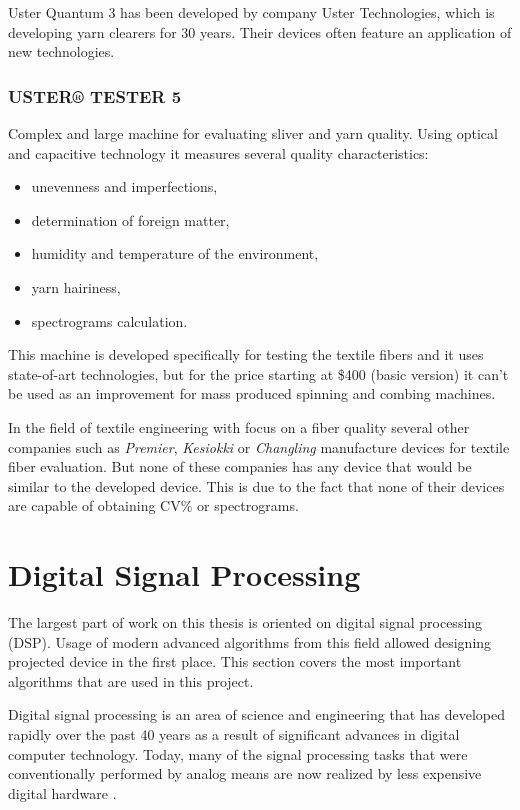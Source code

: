 \documentclass[twoside]{ctuthesis}
\theoremstyle{plain}
\theoremstyle{definition}
\theoremstyle{note}
\begin{document}
Uster Quantum 3 has been developed by company Uster Technologies, which is developing yarn clearers for 30 years. Their devices often feature an application of new technologies.

\subsubsection{USTER® TESTER 5}  
Complex and large machine for evaluating sliver and yarn quality. Using optical and capacitive technology it measures several quality characteristics:
\begin{itemize}
	\setlength{\itemsep}{5pt}
	\item unevenness and imperfections,
	\item determination of foreign matter,
	\item humidity and temperature of the environment,
	\item yarn hairiness,
	\item spectrograms calculation.
\end{itemize}
This machine is developed specifically for testing the textile fibers and it uses state-of-art technologies, but for the price starting at \$400 (basic version) it can't be used as an improvement for mass produced spinning and combing machines.  

In the field of textile engineering with focus on a fiber quality several other companies such as \textit{Premier}, \textit{Kesiokki} or \textit{Changling} manufacture devices for textile fiber evaluation. But none of these companies has any device that would be similar to the developed device. This is due to the fact that none of their devices are capable of obtaining CV\% or spectrograms.

\section{Digital Signal Processing}
The largest part of work on this thesis is oriented on digital signal processing (DSP). Usage of modern advanced algorithms from this field allowed designing projected device in the first place. This section covers the most important algorithms that are used in this project.

Digital signal processing is an area of science and engineering that has developed rapidly over the past 40 years as a result of significant advances in digital computer technology. Today, many of the signal processing tasks that were conventionally performed by analog means are now realized by less expensive digital hardware \cite{cite:2}.
\end{document}
